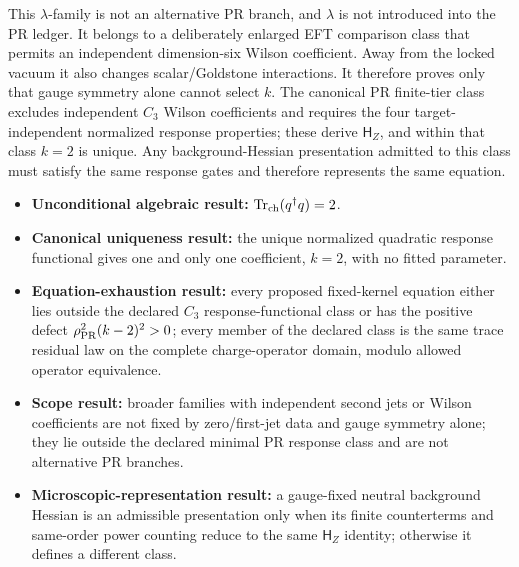 \documentclass[11pt]{article}
\begin{document}
This \(\lambda\)-family is not an alternative PR branch, and \(\lambda\) is not
introduced into the PR ledger.  It belongs to a deliberately enlarged EFT
comparison class that permits an independent dimension-six Wilson
coefficient.  Away from the locked vacuum it also changes scalar/Goldstone
interactions.  It therefore proves only that gauge symmetry alone cannot
select \(k\).  The canonical PR finite-tier class excludes independent \(C_3\)
Wilson coefficients and requires the four target-independent normalized
response properties; these derive \(\mathsf H_Z\), and within that class
\(k=2\) is unique.  Any background-Hessian presentation admitted to this class
must satisfy the same response gates and therefore represents the same
equation.

\begin{tcolorbox}[colback=white!3,colframe=black!55!black,title={Exact status of the neutral \(C_3\) coefficient}]
\begin{itemize}[leftmargin=1.6em]
\item \textbf{Unconditional algebraic result:}
\(\operatorname{Tr}_{\rm ch}(q^\dagger q)=2\).
\item \textbf{Canonical uniqueness result:}
the unique normalized quadratic response functional gives one and only one
coefficient, \(k=2\), with no fitted parameter.
\item \textbf{Equation-exhaustion result:}
every proposed fixed-kernel equation either lies outside the declared
\(C_3\) response-functional class or has the positive defect
\(\rho_{\rm PR}^2(k-2)^2>0\); every member of the declared class is the same
trace residual law on the complete charge-operator domain, modulo allowed
operator equivalence.
\item \textbf{Scope result:}
broader families with independent second jets or Wilson coefficients are not
fixed by zero/first-jet data and gauge symmetry alone; they lie outside the
declared minimal PR response class and are not alternative PR branches.
\item \textbf{Microscopic-representation result:}
a gauge-fixed neutral background Hessian is an admissible presentation only
when its finite counterterms and same-order power counting reduce to the same
\(\mathsf H_Z\) identity; otherwise it defines a different class.
\end{itemize}
\end{tcolorbox}
\end{document}
